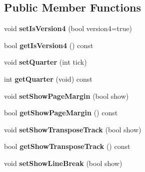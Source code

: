 \subsection*{Public Member Functions}
\begin{DoxyCompactItemize}
\item 
\mbox{\label{class_o_v_e_1_1_ove_song_a062bbf24109d279325190dcef4ae89e9}} 
void {\bfseries set\+Is\+Version4} (bool version4=true)
\item 
\mbox{\label{class_o_v_e_1_1_ove_song_a0f208e2dd99f339716e4a468d67aecde}} 
bool {\bfseries get\+Is\+Version4} () const
\item 
\mbox{\label{class_o_v_e_1_1_ove_song_a6c9d492572ac89a4c590c76523ac3c76}} 
void {\bfseries set\+Quarter} (int tick)
\item 
\mbox{\label{class_o_v_e_1_1_ove_song_aede99856a357128f9856910e926f19c6}} 
int {\bfseries get\+Quarter} (void) const
\item 
\mbox{\label{class_o_v_e_1_1_ove_song_a89c5d7af9e1ac2c496777a0bbf9dd880}} 
void {\bfseries set\+Show\+Page\+Margin} (bool show)
\item 
\mbox{\label{class_o_v_e_1_1_ove_song_a2ff52998497220442a02cc59da234bb0}} 
bool {\bfseries get\+Show\+Page\+Margin} () const
\item 
\mbox{\label{class_o_v_e_1_1_ove_song_a085fd7eed02155ddc46cf1584ec76b6f}} 
void {\bfseries set\+Show\+Transpose\+Track} (bool show)
\item 
\mbox{\label{class_o_v_e_1_1_ove_song_a6d6f518f94355097e92ae48ab3f2a835}} 
bool {\bfseries get\+Show\+Transpose\+Track} () const
\item 
\mbox{\label{class_o_v_e_1_1_ove_song_a2637384baf5d543534826289883f7afc}} 
void {\bfseries set\+Show\+Line\+Break} (bool show)
\item 
\mbox{\label{class_o_v_e_1_1_ove_song_a375b0d5aa1d4dfa3f2600ec1f420e036}} 

\end{DoxyCompactItemize}
